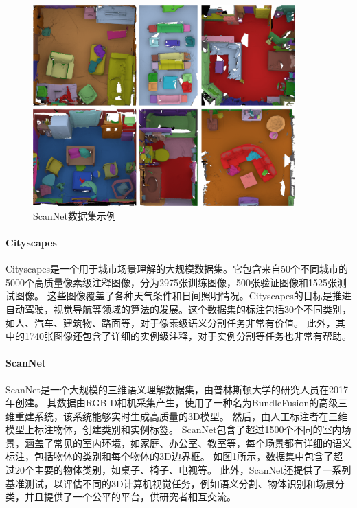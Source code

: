 \begin{figure}[htb]
	\centering
	\includegraphics[width=0.9\textwidth]{figures/scannet_exp.png}
	\caption{ScanNet数据集示例}
	\label{fig:scannet}
\end{figure}

\paragraph{Cityscapes}
Cityscapes是一个用于城市场景理解的大规模数据集。它包含来自50个不同城市的5000个高质量像素级注释图像，分为2975张训练图像，500张验证图像和1525张测试图像。
这些图像覆盖了各种天气条件和日间照明情况。Cityscapes的目标是推进自动驾驶，视觉导航等领域的算法的发展。这个数据集的标注包括30个不同类别，如人、汽车、建筑物、路面等，对于像素级语义分割任务非常有价值。
此外，其中的1740张图像还包含了详细的实例级注释，对于实例分割等任务也非常有帮助。

\paragraph{ScanNet}
ScanNet是一个大规模的三维语义理解数据集，由普林斯顿大学的研究人员在2017年创建。
其数据由RGB-D相机采集产生，使用了一种名为BundleFusion\cite{bundlefusion}的高级三维重建系统，该系统能够实时生成高质量的3D模型。
然后，由人工标注者在三维模型上标注物体，创建类别和实例标签。
ScanNet包含了超过1500个不同的室内场景，涵盖了常见的室内环境，如家庭、办公室、教室等，每个场景都有详细的语义标注，包括物体的类别和每个物体的3D边界框。
如图\ref{fig:scannet}\cite{scannet}所示，数据集中包含了超过20个主要的物体类别，如桌子、椅子、电视等。
此外，ScanNet还提供了一系列基准测试，以评估不同的3D计算机视觉任务，例如语义分割、物体识别和场景分类，并且提供了一个公平的平台，供研究者相互交流。